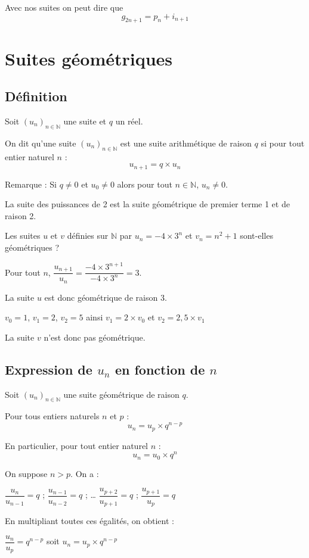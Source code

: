 \documentclass[french]{book}
\newcommand{\N}{\mathbb {N}}
\newcommand{\suite}[1][u]{\left( #1_{n} \right)_{n\in\N}}
\begin{document}
Avec nos suites on peut dire que $$g_{2n+1}=p_{n}+i_{n+1}$$
\newpage

\section{Suites géométriques}
\subsection{Définition}
\begin{defn}
Soit $\suite[u]$ une suite et $q$ un réel.
\par On dit qu'une suite $\suite[u]$ est une suite arithmétique de raison $q$ si pour tout entier naturel $n$ : \[u_{n+1}=q\times u_n\]
\end{defn}

Remarque : Si $q\neq0$ et $u_{0}\neq0$ alors pour tout $n\in\N$, $u_{n}\neq0$.

\begin{exemple}
\par La suite des puissances de 2 est la suite géométrique de premier terme 1 et de raison 2.
\par Les suites $u$ et $v$ définies sur $\N$ par $u_n=-4\times 3^{n}$ et $v_n=n^2+1$ sont-elles géométriques ?


Pour tout $n$, $\dfrac{u_{n+1}}{u_n}=\dfrac{-4\times 3^{n+1}}{-4\times 3^{n}}=3$.
\par La suite $u$ est donc géométrique de raison 3.
\par $v_0=1$, $v_1=2$, $v_2=5$ ainsi $v_1=2\times v_0$ et $v_2=2,5\times v_1$
\par La suite $v$ n'est donc pas géométrique.
\end{exemple}
\subsection{Expression de $u_n$ en fonction de $n$}
\begin{prop}
Soit $\suite[u]$ une suite géométrique de raison $q$.
\par Pour tous entiers naturels $n$ et $p$ : \[u_n=u_p\times q^{n-p}\]
\par En particulier, pour tout entier naturel $n$ : \[u_n=u_0\times q^{n}\]
\end{prop}

\begin{demo}
\par On suppose $n>p$. On a : \\
\par $\dfrac{u_{n}}{u_{n-1}}=q$ ; \hspace{2em} $\dfrac{u_{n-1}}{u_{n-2}}=q$ ; \hspace{2em} \dots \hspace{2em} $\dfrac{u_{p+2}}{u_{p+1}}=q$ ; \hspace{2em} $\dfrac{u_{p+1}}{u_{p}}=q$
\par En multipliant toutes ces égalités, on obtient :
\par $\dfrac{u_{n}}{u_{p}}=q^{n-p}$ soit $u_n=u_p\times q^{n-p}$
\end{demo}
\end{document}
